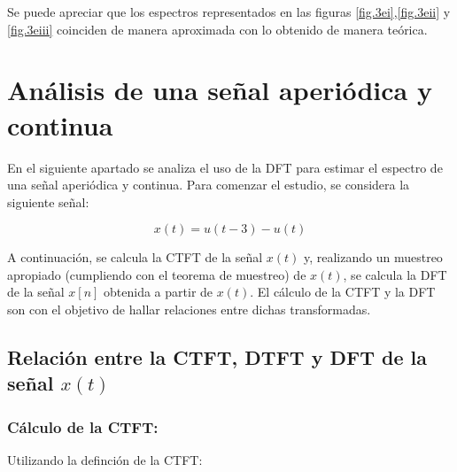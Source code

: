 \documentclass[11pt,a4paper]{article}
\begin{document}
    Se puede apreciar que los espectros representados en las figuras \ref{fig.3ei},\ref{fig.3eii} y \ref{fig.3eiii} coinciden de manera aproximada con lo obtenido de manera teórica. 
    
    


\section{Análisis de una señal aperiódica y continua}

En el siguiente apartado se analiza el uso de la DFT para estimar el espectro de una señal aperiódica y continua. Para comenzar el estudio, se considera la siguiente señal:

\begin{equation}
    x(t)=u(t-3)-u(t)
    \label{eq.xt}
\end{equation}

A continuación, se calcula la CTFT de la señal $x(t)$ y, realizando un muestreo apropiado (cumpliendo con el teorema de muestreo) de $x(t)$, se calcula la DFT de la señal $x[n]$ obtenida a partir de $x(t)$. El cálculo de la CTFT y la DFT son con el objetivo de hallar relaciones entre dichas transformadas.

\subsection{Relación entre la CTFT, DTFT y DFT de la señal $x(t)$}

\subsubsection*{Cálculo de la CTFT:}

Utilizando la definción de la CTFT:
\end{document}
